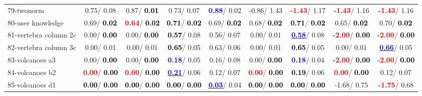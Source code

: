 \begin{table}[h]
\begin{center}
\begin{tabular}{lc|c|c|c|c|c|c|c}
79-twonorm &   0.75/  0.08 &   0.87/\textcolor{black}{\textbf{  0.01}} &   0.73/  0.07 & \textcolor{blue}{\textbf{  0.88}}/  0.02 &  -0.86/  1.43 & \textcolor{red}{\textbf{ -1.43}}/  1.17 & \textcolor{red}{\textbf{ -1.43}}/  1.16 & \textcolor{red}{\textbf{ -1.43}}/  1.16 \\
80-user knowledge &   0.69/\textcolor{black}{\textbf{  0.02}} & \textcolor{red}{\textbf{  0.64}}/\textcolor{black}{\textbf{  0.02}} & \textcolor{black}{\textbf{  0.71}}/\textcolor{black}{\textbf{  0.02}} &   0.69/\textcolor{black}{\textbf{  0.02}} &   0.68/\textcolor{black}{\textbf{  0.02}} & \textcolor{black}{\textbf{  0.71}}/\textcolor{black}{\textbf{  0.02}} &   0.65/\textcolor{black}{\textbf{  0.02}} &   0.70/\textcolor{black}{\textbf{  0.02}} \\
81-vertebra column 2c &   0.00/\textcolor{black}{\textbf{  0.00}} &   0.00/\textcolor{black}{\textbf{  0.00}} & \textcolor{black}{\textbf{  0.57}}/  0.08 &   0.56/  0.07 &   0.00/  0.01 & \underline{\textcolor{blue}{\textbf{  0.58}}}/  0.08 & \textcolor{red}{\textbf{ -2.00}}/\textcolor{black}{\textbf{  0.00}} & \textcolor{red}{\textbf{ -2.00}}/\textcolor{black}{\textbf{  0.00}} \\
82-vertebra column 3c &   0.00/  0.01 &   0.00/  0.01 & \textcolor{black}{\textbf{  0.65}}/  0.05 &   0.63/  0.06 &   0.00/  0.01 & \textcolor{black}{\textbf{  0.65}}/  0.05 &   0.00/  0.01 & \underline{\textcolor{blue}{\textbf{  0.66}}}/  0.05 \\
83-volcanoes a3 &   0.00/\textcolor{black}{\textbf{  0.00}} &   0.00/\textcolor{black}{\textbf{  0.00}} & \textcolor{blue}{\textbf{  0.18}}/  0.05 &   0.16/  0.08 &   0.00/\textcolor{black}{\textbf{  0.00}} & \textcolor{blue}{\textbf{  0.18}}/  0.04 & \textcolor{red}{\textbf{ -2.00}}/\textcolor{black}{\textbf{  0.00}} & \textcolor{red}{\textbf{ -2.00}}/\textcolor{black}{\textbf{  0.00}} \\
84-volcanoes b2 & \textcolor{red}{\textbf{  0.00}}/\textcolor{black}{\textbf{  0.00}} & \textcolor{red}{\textbf{  0.00}}/\textcolor{black}{\textbf{  0.00}} & \underline{\textcolor{blue}{\textbf{  0.21}}}/  0.06 &   0.12/  0.07 & \textcolor{red}{\textbf{  0.00}}/\textcolor{black}{\textbf{  0.00}} & \textcolor{black}{\textbf{  0.19}}/  0.06 & \textcolor{red}{\textbf{  0.00}}/\textcolor{black}{\textbf{  0.00}} &   0.12/  0.07 \\
85-volcanoes d1 & \textcolor{black}{\textbf{  0.00}}/\textcolor{black}{\textbf{  0.00}} & \textcolor{black}{\textbf{  0.00}}/\textcolor{black}{\textbf{  0.00}} & \textcolor{black}{\textbf{  0.00}}/\textcolor{black}{\textbf{  0.00}} & \underline{\textcolor{blue}{\textbf{  0.03}}}/  0.04 & \textcolor{black}{\textbf{  0.00}}/\textcolor{black}{\textbf{  0.00}} & \textcolor{black}{\textbf{  0.00}}/\textcolor{black}{\textbf{  0.00}} &  -1.68/  0.75 & \textcolor{red}{\textbf{ -1.75}}/  0.68 \\ \hline

\end{tabular}
\end{center}
\end{table}
